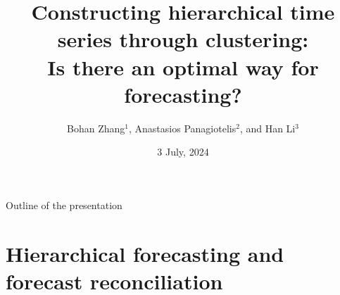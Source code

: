 \documentclass[aspectratio=169]{beamer}
\title[Constructing hierarchical time series through clustering]{Constructing hierarchical time series through clustering: \\Is there an optimal way for forecasting?}
\author[Bohan Zhang]{Bohan Zhang$^{1}$, Anastasios Panagiotelis$^{2}$, and Han Li$^{3}$} %
\institute[] %
  	{\small {$^1$ \small School of Economics and Management, Beihang University}
   \vskip 0.2cm
	\small {$^2$ Discipline of Business Analytics, Business School, University of Sydney}	
    \vskip 0.2cm
  	\small {$^3$ \small Centre for Actuarial Studies, Department of Economics, University of Melbourne}
   \vskip 0.5cm
\textbf{The 44th International Symposium on Forecasting, Dijon, France}
}
\date{3 July, 2024} %
\begin{document}
	
\begin{frame}
\titlepage

\end{frame}
				


 
 
				


\begin{frame}{Outline of the presentation}

\tableofcontents 
\end{frame}

\section{Hierarchical forecasting and forecast reconciliation}
\end{document}
